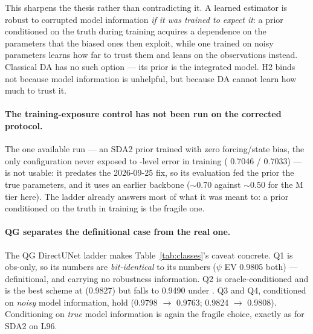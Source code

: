 

This sharpens the thesis rather than contradicting it. A learned estimator is
robust to corrupted model information \emph{if it was trained to expect it}: a
prior conditioned on the truth during training acquires a dependence on the
parameters that the biased ones then exploit, while one trained on noisy
parameters learns how far to trust them and leans on the observations instead.
Classical DA has no such option --- its prior is the integrated model. H2 binds
not because model information is unhelpful, but because DA cannot learn how much
to trust it.

\paragraph{The training-exposure control has not been run on the corrected
protocol.}
The one available run --- an SDA2 prior trained with zero forcing/state bias,
the only configuration never exposed to \So{}-level error in training (\Sz{} 0.7046
/ \So{} 0.7033) --- is not usable: it predates the 2026-09-25 fix, so its \So{}
evaluation fed the prior the true parameters, and it uses an earlier backbone
($\sim$0.70 against $\sim$0.50 for the M tier here). The ladder already answers
most of what it was meant to: a prior conditioned on the truth in training is the
fragile one.

\paragraph{QG separates the definitional case from the real one.}
The QG DirectUNet ladder makes Table~\ref{tab:classes}'s caveat concrete. Q1 is
obs-only, so its \So{} numbers are \emph{bit-identical} to its \Sz{} numbers
($\psi$ EV 0.9805 both) --- definitional, and carrying no robustness
information. Q2 is oracle-conditioned and is the best scheme at \Sz{} (0.9827)
but falls to 0.9490 under \So{}. Q3 and Q4, conditioned on \emph{noisy} model
information, hold (0.9798 $\to$ 0.9763; 0.9824 $\to$ 0.9808). Conditioning on
\emph{true} model information is again the fragile choice, exactly as for SDA2 on
L96.

